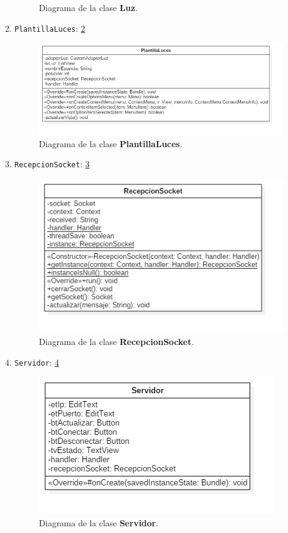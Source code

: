 \begin{enumerate}
\begin{figure}[h!]
		\caption{Diagrama de la clase \textbf{Luz}.}
		\label{fig:Luz}
	\end{figure}
	\item \verb|PlantillaLuces|: \ref{fig:PlantillaLuces}
	\begin{figure}[h!]
		\centering
		\includegraphics[width=1.3\linewidth]{img/PlantillaLuces}
		\caption{Diagrama de la clase \textbf{PlantillaLuces}.}
		\label{fig:PlantillaLuces}
	\end{figure}
	\item \verb|RecepcionSocket|: \ref{fig:RecepcionSocket}
	\begin{figure}[h!]
		\centering
		\includegraphics[width=1\linewidth]{img/RecepcionSocket}
		\caption{Diagrama de la clase \textbf{RecepcionSocket}.}
		\label{fig:RecepcionSocket}
	\end{figure}
	\item \verb|Servidor|: \ref{fig:DiagramaServidor}
	\begin{figure}[h!]
		\centering
		\includegraphics[width=0.9\linewidth]{img/DiagramaServidor}
		\caption{Diagrama de la clase \textbf{Servidor}.}
		\label{fig:DiagramaServidor}
	\end{figure}
\end{enumerate}